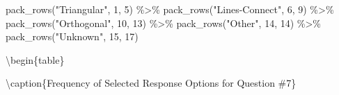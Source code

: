 \documentclass[
  letterpaper,
  DIV=11,
  numbers=noendperiod]{scrreprt}
\newenvironment{Shaded}{\begin{snugshade}}{\end{snugshade}}
\newcommand{\DecValTok}[1]{\textcolor[rgb]{0.68,0.00,0.00}{#1}}
\newcommand{\FunctionTok}[1]{\textcolor[rgb]{0.28,0.35,0.67}{#1}}
\newcommand{\NormalTok}[1]{\textcolor[rgb]{0.00,0.23,0.31}{#1}}
\newcommand{\SpecialCharTok}[1]{\textcolor[rgb]{0.37,0.37,0.37}{#1}}
\newcommand{\StringTok}[1]{\textcolor[rgb]{0.13,0.47,0.30}{#1}}
\begin{document}
\begin{Shaded}
\begin{Highlighting}[]
  \FunctionTok{pack\_rows}\NormalTok{(}\StringTok{"Triangular"}\NormalTok{, }\DecValTok{1}\NormalTok{, }\DecValTok{5}\NormalTok{) }\SpecialCharTok{\%\textgreater{}\%}
  \FunctionTok{pack\_rows}\NormalTok{(}\StringTok{"Lines{-}Connect"}\NormalTok{, }\DecValTok{6}\NormalTok{, }\DecValTok{9}\NormalTok{) }\SpecialCharTok{\%\textgreater{}\%}
  \FunctionTok{pack\_rows}\NormalTok{(}\StringTok{"Orthogonal"}\NormalTok{, }\DecValTok{10}\NormalTok{, }\DecValTok{13}\NormalTok{) }\SpecialCharTok{\%\textgreater{}\%}
  \FunctionTok{pack\_rows}\NormalTok{(}\StringTok{"Other"}\NormalTok{, }\DecValTok{14}\NormalTok{, }\DecValTok{14}\NormalTok{) }\SpecialCharTok{\%\textgreater{}\%}
  \FunctionTok{pack\_rows}\NormalTok{(}\StringTok{"Unknown"}\NormalTok{, }\DecValTok{15}\NormalTok{, }\DecValTok{17}\NormalTok{)}
\end{Highlighting}
\end{Shaded}

\textbackslash begin\{table\}

\textbackslash caption\{\label{tab:Q7-RESPONSES}Frequency of Selected
Response Options for Question \#7\} \centering
\end{document}
